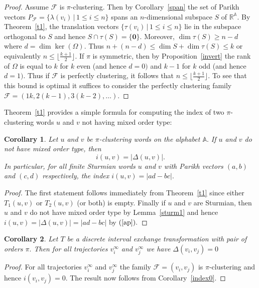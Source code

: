 \documentclass[12pt,a4paper]{amsart}
\newcommand{\reals}{{\mathbb R}}
\newcommand{\A}{{\mathbb A}}
\newtheorem{corollary}{Corollary}
\begin{document}
\begin{proof}Assume $\mathcal F$ is $\pi$-clustering. Then by Corollary~\ref{span} the set of Parikh vectors
$P_{\mathcal F}= \{\lambda (v_i)\,|\,1\leq i\leq n\}$ spans an $n$-dimensional subspace $S$ of $\reals^\A.$ By Theorem~\ref{t1}, the translation vectors $ \{\tau (v_i)\,|\,1\leq i\leq n\}$ lie in the subspace orthogonal to $S$ and hence $S\cap \tau(S)=\{\mathbf 0\}.$ Moreover, $\dim \tau(S)  \geq n-d$ where $d=\dim \ker (\Omega).$ Thus $n+ (n-d) \leq \dim S + \dim \tau(S) \leq k$ or equivalently $n\leq \lfloor \frac {k+1}{2} \rfloor.$
If $\pi$ is symmetric, then by Proposition~\ref{invert} the rank of $\Omega$ is equal to $k$ for $k$ even (and hence $d=0)$ and $k-1$ for $k$ odd (and hence $d=1).$ Thus if $\mathcal F$ is perfectly clustering, it follows that $n\leq \lfloor \frac {k+1}{2} \rfloor.$ To see that this bound is optimal it suffices to consider the perfectly clustering family $\mathcal F=(1k, 2(k-1),3(k-2),\ldots ).$\end{proof}

Theorem~\ref{t1} provides a simple formula for computing the index of two $\pi$-clustering words $u$ and $v$ not having mixed order type: 
 
\begin{corollary}\label{isturm}Let $u$ and $v$ be  $\pi$-clustering words on the alphabet $\A.$ If $u$ and $v$ do not have mixed order type, then \[i(u,v)=|\Delta(u,v)|.\]
In particular, for all finite Sturmian words $u$ and $v$ with Parikh vectors $(a,b)$ and $(c,d)$ respectively,  the index $i(u,v)=|ad-bc|.$ 
\end{corollary}

\begin{proof} The first statement follows immediately from Theorem~\ref{t1} since either $T_1(u,v)$ or $T_2(u,v)$ (or both) is empty.  Finally if $u$ and $v$ are Sturmian, then  $u$ and $v$ do not have mixed order type by Lemma~\ref{sturm1} and hence $i(u,v)=|\Delta(u,v)|=|ad-bc|$ by  $(\ref{ap}).$
\end{proof} 

\begin{corollary}\label{traj} Let $T$ be a discrete interval exchange transformation with pair of orders $\pi.$ Then for all trajectories $v_i^\infty$ and $v_j^\infty$  we have $\Delta(v_i,v_j)=0$ 
\end{corollary} 

\begin{proof} For all trajectories $v_i^\infty$ and $v_j^\infty$ the family $\mathcal F=(v_i,v_j)$ is $\pi$-clustering and hence $i(v_i,v_j)=0.$ The result now follows from Corollary~\ref{index0}.
\end{proof}
\end{document}
